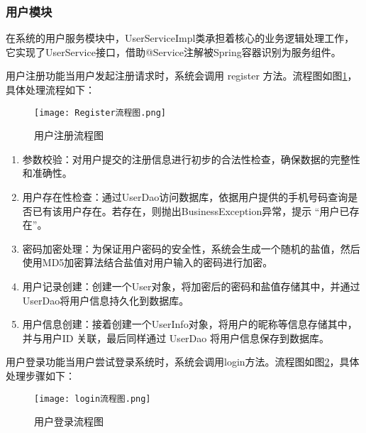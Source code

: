 \subsubsection{用户模块}

在系统的用户服务模块中，UserServiceImpl类承担着核心的业务逻辑处理工作，它实现了UserService接口，借助@Service注解被Spring容器识别为服务组件。

用户注册功能当用户发起注册请求时，系统会调用 register 方法。流程图如图\ref{用户注册流程图}，具体处理流程如下：

\begin{figure}[hbt]
    \centering
    \texttt{[image: Register流程图.png]}
    \caption{用户注册流程图}
    \label{用户注册流程图}
\end{figure}


\begin{enumerate}[label=(\arabic*)]
    \item 参数校验：对用户提交的注册信息进行初步的合法性检查，确保数据的完整性和准确性。
    \item 用户存在性检查：通过UserDao访问数据库，依据用户提供的手机号码查询是否已有该用户存在。若存在，则抛出BusinessException异常，提示 “用户已存在”。
    \item 密码加密处理：为保证用户密码的安全性，系统会生成一个随机的盐值，然后使用MD5加密算法结合盐值对用户输入的密码进行加密。
    \item 用户记录创建：创建一个User对象，将加密后的密码和盐值存储其中，并通过UserDao将用户信息持久化到数据库。
    \item 用户信息创建：接着创建一个UserInfo对象，将用户的昵称等信息存储其中，并与用户ID 关联，最后同样通过 UserDao 将用户信息保存到数据库。

\end{enumerate}

用户登录功能当用户尝试登录系统时，系统会调用login方法。流程图如图\ref{用户登录流程图}，具体处理步骤如下：

\begin{figure}[hbt]
    \centering
    \texttt{[image: login流程图.png]}
    \caption{用户登录流程图}
    \label{用户登录流程图}
\end{figure}


